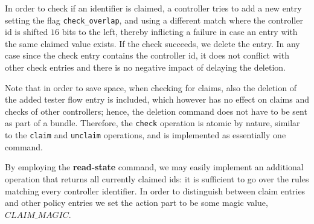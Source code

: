 \documentclass[conference]{sigcomm-alternate}
\newcommand{\claimcheck}{check\xspace}
\newcommand{\checko}{\texttt{check\_overlap}\xspace}
\newcommand{\claimmagic}{\textit{CLAIM\_MAGIC}}
\begin{document}
In order to check if an identifier is claimed, a controller tries to add
a new entry setting the flag \texttt{\checko}, and using a different
match where the controller id is shifted $16$ bits to the left,
thereby inflicting a failure in case an entry with the same claimed value exists.
If the check succeeds, we delete the entry. In any case since the check entry contains the controller id, it does not conflict with other check entries and there is no negative impact of delaying the deletion.

Note that in order to save space, when checking for claims, also the deletion of the added tester flow entry is included,
which however has no effect on claims and checks of other controllers; hence, the deletion command does not
have to be sent as part of a bundle. Therefore, the \texttt{\claimcheck} operation is atomic by nature,
similar to the \texttt{claim} and \texttt{unclaim} operations, and is
implemented as essentially one command.

By employing the \textbf{read-state} command, we may easily implement
an additional operation that returns all currently claimed ids: it is
sufficient to go over the rules matching every controller identifier.
In order to distinguish between claim entries and other policy entries we set the action part to be some magic value, $\claimmagic$.
\end{document}
